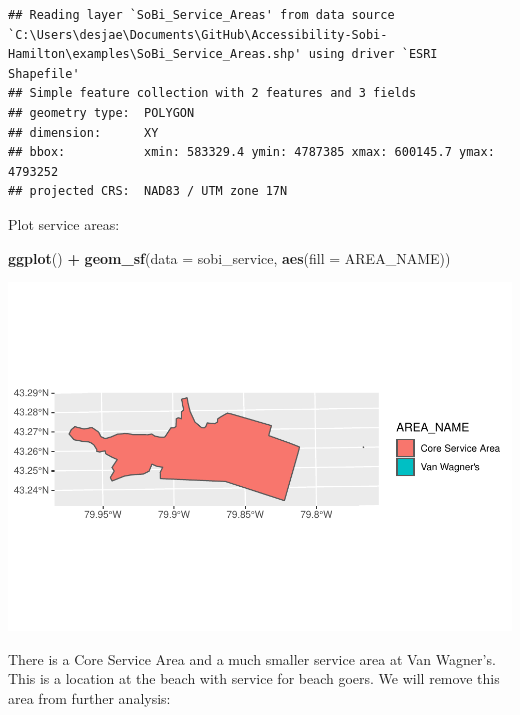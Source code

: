 \documentclass[
]{article}
\newenvironment{Shaded}{\begin{snugshade}}{\end{snugshade}}
\newcommand{\DataTypeTok}[1]{\textcolor[rgb]{0.13,0.29,0.53}{#1}}
\newcommand{\KeywordTok}[1]{\textcolor[rgb]{0.13,0.29,0.53}{\textbf{#1}}}
\newcommand{\NormalTok}[1]{#1}
\newcommand{\OperatorTok}[1]{\textcolor[rgb]{0.81,0.36,0.00}{\textbf{#1}}}
\newcommand{\StringTok}[1]{\textcolor[rgb]{0.31,0.60,0.02}{#1}}
\begin{document}
\begin{verbatim}
## Reading layer `SoBi_Service_Areas' from data source `C:\Users\desjae\Documents\GitHub\Accessibility-Sobi-Hamilton\examples\SoBi_Service_Areas.shp' using driver `ESRI Shapefile'
## Simple feature collection with 2 features and 3 fields
## geometry type:  POLYGON
## dimension:      XY
## bbox:           xmin: 583329.4 ymin: 4787385 xmax: 600145.7 ymax: 4793252
## projected CRS:  NAD83 / UTM zone 17N
\end{verbatim}

Plot service areas:

\begin{Shaded}
\begin{Highlighting}[]
\KeywordTok{ggplot}\NormalTok{() }\OperatorTok{+}
\StringTok{  }\KeywordTok{geom_sf}\NormalTok{(}\DataTypeTok{data =}\NormalTok{ sobi_service,}
          \KeywordTok{aes}\NormalTok{(}\DataTypeTok{fill =}\NormalTok{ AREA_NAME))}
\end{Highlighting}
\end{Shaded}

\includegraphics{00-Data-Processing-Example_files/figure-latex/unnamed-chunk-8-1.pdf}

There is a Core Service Area and a much smaller service area at Van
Wagner's. This is a location at the beach with service for beach goers.
We will remove this area from further analysis:

\begin{Shaded}
\end{Shaded}
\end{document}
